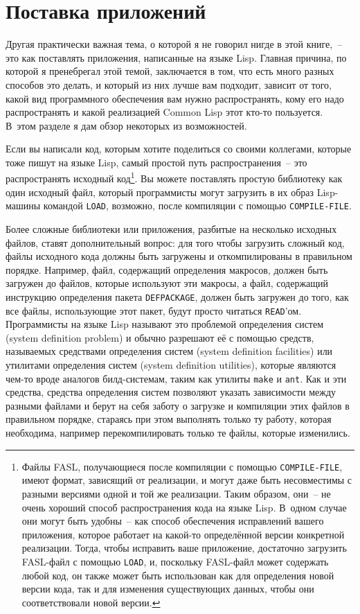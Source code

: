 \section{Поставка приложений}

Другая практически важная тема, о которой я не говорил нигде в этой книге,~-- это как
поставлять приложения, написанные на языке Lisp. Главная причина, по которой я пренебрегал
этой темой, заключается в том, что есть много разных способов это делать, и который из них
лучше вам подходит, зависит от того, какой вид программного обеспечения вам нужно
распространять, кому его надо распространять и какой реализацией Common Lisp этот кто-то
пользуется. В~этом разделе я дам обзор некоторых из возможностей.

Если вы написали код, которым хотите поделиться со своими коллегами, которые тоже пишут на
языке Lisp, самый простой путь распространения~-- это распространять исходный
код\footnote{Файлы FASL, получающиеся после компиляции с помощью \lstinline{COMPILE-FILE},
  имеют формат, зависящий от реализации, и могут даже быть несовместимы с разными версиями
  одной и той же реализации. Таким образом, они~-- не очень хороший способ распространения
  кода на языке Lisp. В~одном случае они могут быть удобны~-- как способ обеспечения
  исправлений вашего приложения, которое работает на какой-то определённой версии
  конкретной реализации. Тогда, чтобы исправить ваше приложение, достаточно загрузить
  FASL-файл с помощью \lstinline{LOAD}, и, поскольку FASL-файл может содержать любой код, он
  также может быть использован как для определения новой версии кода, так и для изменения
  существующих данных, чтобы они соответствовали новой версии.}\hspace{\footnotenegspace}. Вы можете поставлять
простую библиотеку как один исходный файл, который программисты могут загрузить в их образ
Lisp-машины командой \lstinline{LOAD}, возможно, после компиляции с помощью
\lstinline{COMPILE-FILE}.

Более сложные библиотеки или приложения, разбитые на несколько исходных файлов, ставят
дополнительный вопрос: для того чтобы загрузить сложный код, файлы исходного кода должны
быть загружены и откомпилированы в правильном порядке. Например, файл, содержащий
определения макросов, должен быть загружен до файлов, которые используют эти макросы, а
файл, содержащий инструкцию определения пакета \lstinline{DEFPACKAGE}, должен быть загружен до
того, как все файлы, использующие этот пакет, будут просто читаться
\lstinline{READ}'ом. Программисты на языке Lisp называют это проб\-ле\-мой определения систем
(system definition problem) и обычно разрешают её с по\-мощью средств, называемых средствами
определения систем (system definition facilities) или утилитами определения систем (system
definition utilities), которые являются чем-то вроде аналогов билд-системам, таким как
утилиты \lstinline{make} и \lstinline{ant}. Как и эти средства, средства определения систем
позволяют указать зависимости между разными файлами и берут на себя заботу о загрузке и
компиляции этих файлов в правильном порядке, стараясь при этом выполнять только ту работу,
которая необходима, например перекомпилировать только те файлы, которые изменились.

